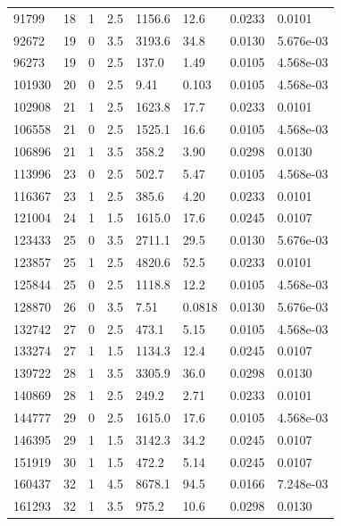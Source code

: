 \documentclass[preview]{standalone}
\begin{document}
{{{\begin{tabular}{L{1.2cm}C{1.2cm} C{0.3cm}C{0.5cm} C{1.4cm}C{1.4cm} C{1.4cm}C{1.4cm}}
  91799  &    18  & 1     & 2.5 &  1156.6  & 12.6  & 0.0233 &  0.0101   \\ 
  92672  &    19  & 0     & 3.5 &  3193.6  & 34.8  & 0.0130 &  5.676e-03   \\ 
  96273  &    19  & 0     & 2.5 &  137.0  & 1.49  & 0.0105 &  4.568e-03   \\ 
  101930  &    20  & 0     & 2.5 &  9.41  & 0.103  & 0.0105 &  4.568e-03   \\ 
  102908  &    21  & 1     & 2.5 &  1623.8  & 17.7  & 0.0233 &  0.0101   \\ 
  106558  &    21  & 0     & 2.5 &  1525.1  & 16.6  & 0.0105 &  4.568e-03   \\ 
  106896  &    21  & 1     & 3.5 &  358.2  & 3.90  & 0.0298 &  0.0130   \\ 
  113996  &    23  & 0     & 2.5 &  502.7  & 5.47  & 0.0105 &  4.568e-03   \\ 
  116367  &    23  & 1     & 2.5 &  385.6  & 4.20  & 0.0233 &  0.0101   \\ 
  121004  &    24  & 1     & 1.5 &  1615.0  & 17.6  & 0.0245 &  0.0107   \\ 
  123433  &    25  & 0     & 3.5 &  2711.1  & 29.5  & 0.0130 &  5.676e-03   \\ 
  123857  &    25  & 1     & 2.5 &  4820.6  & 52.5  & 0.0233 &  0.0101   \\ 
  125844  &    25  & 0     & 2.5 &  1118.8  & 12.2  & 0.0105 &  4.568e-03   \\ 
  128870  &    26  & 0     & 3.5 &  7.51  & 0.0818  & 0.0130 &  5.676e-03   \\ 
  132742  &    27  & 0     & 2.5 &  473.1  & 5.15  & 0.0105 &  4.568e-03   \\ 
  133274  &    27  & 1     & 1.5 &  1134.3  & 12.4  & 0.0245 &  0.0107   \\ 
  139722  &    28  & 1     & 3.5 &  3305.9  & 36.0  & 0.0298 &  0.0130   \\ 
  140869  &    28  & 1     & 2.5 &  249.2  & 2.71  & 0.0233 &  0.0101   \\ 
  144777  &    29  & 0     & 2.5 &  1615.0  & 17.6  & 0.0105 &  4.568e-03   \\ 
  146395  &    29  & 1     & 1.5 &  3142.3  & 34.2  & 0.0245 &  0.0107   \\ 
  151919  &    30  & 1     & 1.5 &  472.2  & 5.14  & 0.0245 &  0.0107   \\ 
  160437  &    32  & 1     & 4.5 &  8678.1  & 94.5  & 0.0166 &  7.248e-03   \\ 
  161293  &    32  & 1     & 3.5 &  975.2  & 10.6  & 0.0298 &  0.0130   \\ 

\end{tabular}}}}
\end{document}

